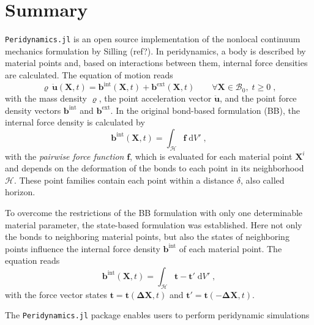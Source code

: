 \documentclass{juliacon}
\newcommand{\vb}{\boldsymbol}
\begin{document}


\maketitle

\section{Summary}

\texttt{Peridynamics.jl} is an open source implementation of the nonlocal continuum mechanics formulation by Silling (ref?).
In peridynamics, a body is described by material points and, based on interactions between them, internal force densities are calculated. 
The equation of motion reads
\begin{equation}
    \varrho \, \vb{\ddot{u}}(\vb{X},t) = \vb{b}^{\mathrm{int}}(\vb{X},t) + \vb{b}^{\mathrm{ext}}(\vb{X},t) \qquad \forall \vb{X} \in \mathcal{B}_0, \; t \geq 0 \; ,
\end{equation} 
with the mass density $\varrho$, the point acceleration vector $\vb{\ddot{u}}$, and the point force density vectors $\vb{b}^{\mathrm{int}}$ and $\vb{b}^{\mathrm{ext}}$. 
In the original bond-based formulation (BB), the internal force density is calculated by
\begin{equation}
    \vb{b}^{\mathrm{int}}(\vb{X},t) = \int_\mathcal{H} \vb{f} \; \mathrm{d}V' \; ,
\end{equation}
with the \emph{pairwise force function} $\vb{f}$, which is evaluated for each material point $\vb{X}^i$ and depends on the deformation of the bonds to each point in its neighborhood $\mathcal{H}$.
These point families contain each point within a distance $\delta$, also called horizon.

To overcome the restrictions of the BB formulation with only one determinable material parameter, the state-based formulation was established.
Here not only the bonds to neighboring material points, but also the states of neighboring points influence the internal force density $\vb{b}^{\mathrm{int}}$ of each material point.
The equation reads
\begin{equation}
    \vb{b}^{\mathrm{int}} (\vb{X},t) = \int_\mathcal{H} \vb{t} - \vb{t}' \; \mathrm{d}V' \; ,
\end{equation}
with the force vector states $\vb{t}=\vb{t}(\vb{\Delta X}, t)$ and $\vb{t}'=\vb{t}(-\vb{\Delta X}, t)$.

The \texttt{Peridynamics.jl} package enables users to perform peridynamic simulations 
\end{document}
